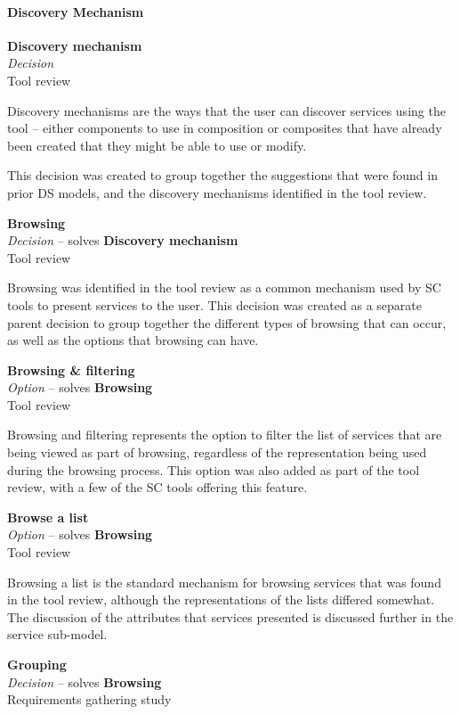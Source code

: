 \paragraph{Discovery Mechanism}

\textbf{Discovery mechanism} \\ \emph{Decision} \\ Tool review

Discovery mechanisms are the ways that the user can discover services using the tool -- either components to use in composition or composites that have already been created that they might be able to use or modify.

This decision was created to group together the suggestions that were found in prior DS models, and the discovery mechanisms identified in the tool review.

\textbf{Browsing} \\ \emph{Decision} -- solves \textbf{Discovery mechanism} \\ Tool review

Browsing was identified in the tool review as a common mechanism used by SC tools to present services to the user. This decision was created as a separate parent decision to group together the different types of browsing that can occur, as well as the options that browsing can have.

\textbf{Browsing \& filtering} \\ \emph{Option} -- solves \textbf{Browsing} \\ Tool review

Browsing and filtering represents the option to filter the list of services that are being viewed as part of browsing, regardless of the representation being used during the browsing process. This option was also added as part of the tool review, with a few of the SC tools offering this feature.

\textbf{Browse a list} \\ \emph{Option} -- solves \textbf{Browsing} \\ Tool review

Browsing a list is the standard mechanism for browsing services that was found in the tool review, although the representations of the lists differed somewhat. The discussion of the attributes that services presented is discussed further in the service sub-model.

\textbf{Grouping} \\ \emph{Decision} -- solves \textbf{Browsing} \\ Requirements gathering study

